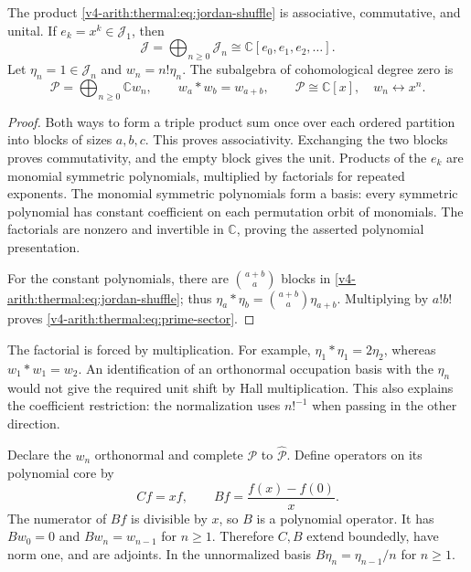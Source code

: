 \begin{proposition}
\label{v4-arith:thermal:prop:jordan-polynomial}
The product \eqref{v4-arith:thermal:eq:jordan-shuffle} is associative, commutative,
and unital. If $e_k=x^k\in\mathcal J_1$, then
\[
 \mathcal J=\bigoplus_{n\geq0}\mathcal J_n
   \cong\mathbb C[e_0,e_1,e_2,\ldots].
\]
Let $\eta_n=1\in\mathcal J_n$ and $w_n=n!\eta_n$.
The subalgebra of cohomological degree zero is
\begin{equation}
 \mathcal P=\bigoplus_{n\geq0}\mathbb C w_n,
 \qquad w_a*w_b=w_{a+b},
 \qquad \mathcal P\cong\mathbb C[x],\quad w_n\leftrightarrow x^n.
 \label{v4-arith:thermal:eq:prime-sector}
\end{equation}
\end{proposition}

\begin{proof}
Both ways to form a triple product sum once over each ordered
partition into blocks of sizes $a,b,c$. This proves associativity.
Exchanging the two blocks proves commutativity, and the empty block
gives the unit. Products of the $e_k$ are monomial symmetric
polynomials, multiplied by factorials for repeated exponents.
The monomial symmetric polynomials form a basis: every symmetric
polynomial has constant coefficient on each permutation orbit of
monomials. The factorials are nonzero and invertible in
$\mathbb C$, proving the asserted polynomial presentation.

For the constant polynomials, there are $\binom{a+b}{a}$ blocks
in \eqref{v4-arith:thermal:eq:jordan-shuffle}; thus
$\eta_a*\eta_b=\binom{a+b}{a}\eta_{a+b}$.
Multiplying by $a!b!$ proves \eqref{v4-arith:thermal:eq:prime-sector}.
\end{proof}

The factorial is forced by multiplication. For example,
$\eta_1*\eta_1=2\eta_2$, whereas $w_1*w_1=w_2$.
An identification of an orthonormal occupation basis with the
$\eta_n$ would not give the required unit shift by Hall
multiplication. This also explains the coefficient restriction:
the normalization uses $n!^{-1}$ when passing in the other direction.

Declare the $w_n$ orthonormal and complete $\mathcal P$ to
$\widehat{\mathcal P}$. Define operators on its polynomial core by
\[
 Cf=x f,\qquad
 Bf=\frac{f(x)-f(0)}x.
\]
The numerator of $Bf$ is divisible by $x$, so $B$ is a polynomial
operator. It has $Bw_0=0$ and $Bw_n=w_{n-1}$ for $n\geq1$.
Therefore $C,B$ extend boundedly, have norm one, and are adjoints.
In the unnormalized basis $B\eta_n=\eta_{n-1}/n$ for $n\geq1$.

